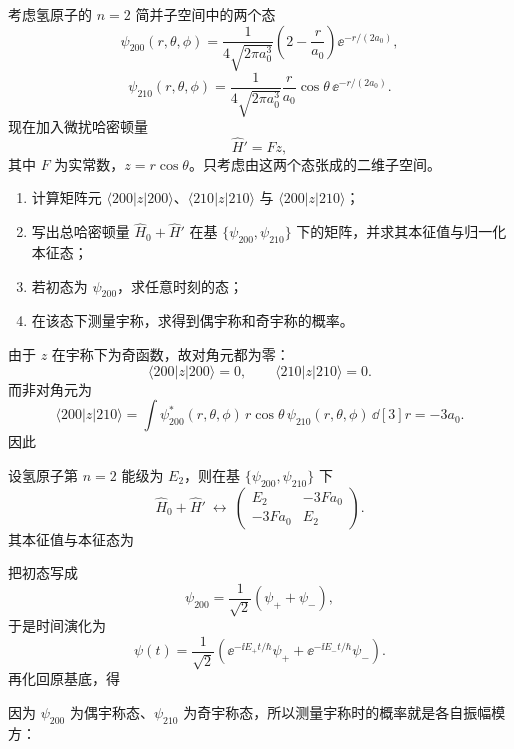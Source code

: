 \begin{question}
考虑氢原子的 $n=2$ 简并子空间中的两个态
\[
\psi_{200}(r,\theta,\phi)=\frac{1}{4\sqrt{2\pi a_0^3}}\left(2-\frac{r}{a_0}\right)\ee^{-r/(2a_0)},
\]
\[
\psi_{210}(r,\theta,\phi)=\frac{1}{4\sqrt{2\pi a_0^3}}\frac{r}{a_0}\cos\theta\,\ee^{-r/(2a_0)}.
\]
现在加入微扰哈密顿量
\[
\hat H'=F z,
\]
其中 $F$ 为实常数，$z=r\cos\theta$。只考虑由这两个态张成的二维子空间。

\begin{enumerate}[label=(\arabic*),leftmargin=2.5em]
  \item 计算矩阵元 $\langle 200|z|200\rangle$、$\langle 210|z|210\rangle$ 与 $\langle 200|z|210\rangle$；
  \item 写出总哈密顿量 $\hat H_0+\hat H'$ 在基 $\{\psi_{200},\psi_{210}\}$ 下的矩阵，并求其本征值与归一化本征态；
  \item 若初态为 $\psi_{200}$，求任意时刻的态；
  \item 在该态下测量宇称，求得到偶宇称和奇宇称的概率。
\end{enumerate}

\begin{solution}
由于 $z$ 在宇称下为奇函数，故对角元都为零：
\[
\langle 200|z|200\rangle=0,
\qquad
\langle 210|z|210\rangle=0.
\]
而非对角元为
\[
\langle 200|z|210\rangle
=\int \psi_{200}^*(r,\theta,\phi)\,r\cos\theta\,\psi_{210}(r,\theta,\phi)\,\dd[3]{r}
=-3a_0.
\]
因此

设氢原子第 $n=2$ 能级为 $E_2$，则在基 $\{\psi_{200},\psi_{210}\}$ 下
\[
\hat H_0+\hat H'\ \longleftrightarrow\ 
\begin{pmatrix}
E_2 & -3Fa_0\\
-3Fa_0 & E_2
\end{pmatrix}.
\]
其本征值与本征态为

把初态写成
\[
\psi_{200}=\frac{1}{\sqrt2}(\psi_++\psi_-),
\]
于是时间演化为
\[
\psi(t)=\frac{1}{\sqrt2}\left(\ee^{-\ii E_+ t/\hbar}\psi_++\ee^{-\ii E_- t/\hbar}\psi_-\right).
\]
再化回原基底，得

因为 $\psi_{200}$ 为偶宇称态、$\psi_{210}$ 为奇宇称态，所以测量宇称时的概率就是各自振幅模方：
\end{solution}
\end{question}

